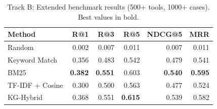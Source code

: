 \begin{table}[t]
\centering
\caption{Track B: Extended benchmark results (500+ tools, 1000+ cases). Best values in bold.}
\label{tab:track-comparison}
\begin{tabular}{lrrrrr}
\toprule
Method & R@1 & R@3 & R@5 & NDCG@5 & MRR \\
\midrule
Random & 0.002 & 0.007 & 0.011 & 0.007 & 0.011 \\
Keyword Match & 0.356 & 0.483 & 0.542 & 0.479 & 0.541 \\
BM25 & \textbf{0.382} & \textbf{0.551} & 0.603 & \textbf{0.540} & \textbf{0.595} \\
TF-IDF + Cosine & 0.300 & 0.500 & 0.563 & 0.477 & 0.524 \\
KG-Hybrid & 0.368 & 0.551 & \textbf{0.615} & 0.539 & 0.582 \\
\bottomrule
\end{tabular}
\end{table}
